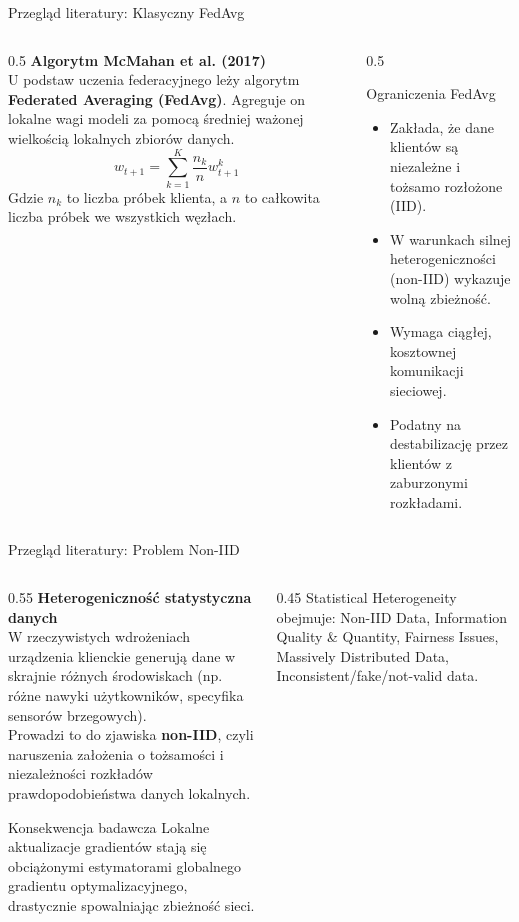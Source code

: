 \documentclass[9pt,aspectratio=169]{beamer}
\begin{document}
\begin{frame}{Przegląd literatury: Klasyczny FedAvg}
\begin{columns}[T]
\begin{column}{0.5\textwidth}
\textbf{Algorytm McMahan et al. (2017)}\\[4pt]
U podstaw uczenia federacyjnego leży algorytm \textbf{Federated Averaging (FedAvg)}. Agreguje on lokalne wagi modeli za pomocą średniej ważonej wielkością lokalnych zbiorów danych.
\[
w_{t+1} = \sum_{k=1}^{K} \frac{n_k}{n} w_{t+1}^k
\]
{\footnotesize Gdzie $n_k$ to liczba próbek klienta, a $n$ to całkowita liczba próbek we wszystkich węzłach.}
\end{column}
\begin{column}{0.5\textwidth}
\begin{infobox}{Ograniczenia FedAvg}
\begin{itemize}\footnotesize
\item Zakłada, że dane klientów są niezależne i tożsamo rozłożone (IID).
\item W warunkach silnej heterogeniczności (non-IID) wykazuje wolną zbieżność.
\item Wymaga ciągłej, kosztownej komunikacji sieciowej.
\item Podatny na destabilizację przez klientów z zaburzonymi rozkładami.
\end{itemize}
\end{infobox}
\end{column}
\end{columns}
\end{frame}

\begin{frame}{Przegląd literatury: Problem Non-IID}
\begin{columns}[T]
\begin{column}{0.55\textwidth}
\textbf{Heterogeniczność statystyczna danych}\\[4pt]
W rzeczywistych wdrożeniach urządzenia klienckie generują dane w skrajnie różnych środowiskach (np. różne nawyki użytkowników, specyfika sensorów brzegowych).\\[6pt]
Prowadzi to do zjawiska \textbf{non-IID}, czyli naruszenia założenia o tożsamości i niezależności rozkładów prawdopodobieństwa danych lokalnych.
\begin{infoboxorange}{Konsekwencja badawcza}
Lokalne aktualizacje gradientów stają się obciążonymi estymatorami globalnego gradientu optymalizacyjnego, drastycznie spowalniając zbieżność sieci.
\end{infoboxorange}
\end{column}
\begin{column}{0.45\textwidth}
\centering\footnotesize
Statistical Heterogeneity obejmuje: Non-IID Data, Information Quality \& Quantity, Fairness Issues, Massively Distributed Data, Inconsistent/fake/not-valid data.
\end{column}
\end{columns}
\end{frame}
\end{document}
